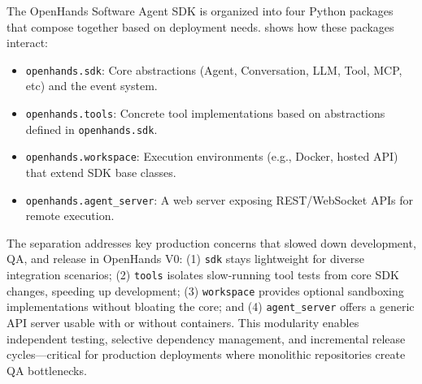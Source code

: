 The OpenHands Software Agent SDK is organized into four Python packages that compose together based on deployment needs. 
% 
 shows how these packages interact:
\begin{itemize}[noitemsep,topsep=0pt,parsep=0pt,partopsep=0pt,leftmargin=8pt]
  \item \texttt{openhands.sdk}: Core abstractions (Agent, Conversation, LLM, Tool, MCP, etc) and the event system.
  \item \texttt{openhands.tools}: Concrete tool implementations based on abstractions defined in \texttt{openhands.sdk}.
  \item \texttt{openhands.workspace}: Execution environments (e.g., Docker, hosted API) that extend SDK base classes.
  \item \texttt{openhands.agent\_server}: A web server exposing REST/WebSocket APIs for remote execution.
\end{itemize}

The separation addresses key production concerns that slowed down development, QA, and release in OpenHands V0: (1) \texttt{sdk} stays lightweight for diverse integration scenarios; (2) \texttt{tools} isolates slow-running tool tests from core SDK changes, speeding up development; (3) \texttt{workspace} provides optional sandboxing implementations without bloating the core; and (4) \texttt{agent\_server} offers a generic API server usable with or without containers.
This modularity enables independent testing, selective dependency management, and incremental release cycles—critical for production deployments where monolithic repositories create QA bottlenecks.





